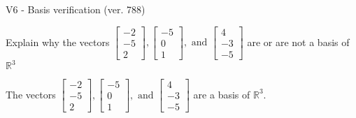 \begin{exercise}
  \begin{exerciseTitle}V6 - Basis verification (ver. 788)\end{exerciseTitle}
  \begin{exerciseStatement}
    Explain why the vectors \(\left[\begin{array}{r}
-2 \\
-5 \\
2
\end{array}\right] , \left[\begin{array}{r}
-5 \\
0 \\
1
\end{array}\right] , \text{ and } \left[\begin{array}{r}
4 \\
-3 \\
-5
\end{array}\right]\) are or are not a basis of \(\mathbb{R}^3\)	


  \end{exerciseStatement}
  \begin{exerciseAnswer}
   The vectors \(\left[\begin{array}{r}
-2 \\
-5 \\
2
\end{array}\right] , \left[\begin{array}{r}
-5 \\
0 \\
1
\end{array}\right] , \text{ and } \left[\begin{array}{r}
4 \\
-3 \\
-5
\end{array}\right]\) 
  	 are  a basis of \(\mathbb{R}^3\).
  


  \end{exerciseAnswer}
\end{exercise}